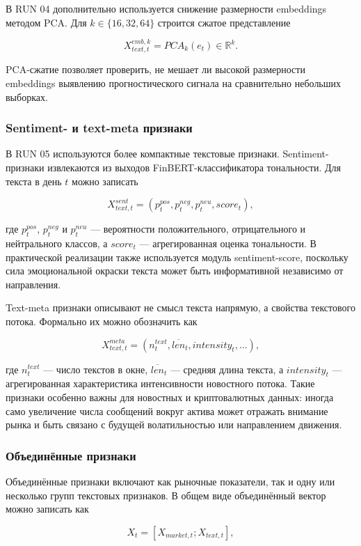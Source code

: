 В RUN 04 дополнительно используется снижение размерности embeddings методом PCA. Для $k \in \{16,32,64\}$ строится сжатое представление

\[
X_{text,t}^{emb,k} = PCA_k(e_t) \in \mathbb{R}^{k}.
\]

PCA-сжатие позволяет проверить, не мешает ли высокой размерности embeddings выявлению прогностического сигнала на сравнительно небольших выборках.

\subsubsection{Sentiment- и text-meta признаки}

В RUN 05 используются более компактные текстовые признаки. Sentiment-признаки извлекаются из выходов FinBERT-классификатора тональности. Для текста в день $t$ можно записать

\[
X_{text,t}^{sent} = \left(p_t^{pos}, p_t^{neg}, p_t^{neu}, score_t\right),
\]

где $p_t^{pos}$, $p_t^{neg}$ и $p_t^{neu}$ --- вероятности положительного, отрицательного и нейтрального классов, а $score_t$ --- агрегированная оценка тональности. В практической реализации также используется модуль sentiment-score, поскольку сила эмоциональной окраски текста может быть информативной независимо от направления.

Text-meta признаки описывают не смысл текста напрямую, а свойства текстового потока. Формально их можно обозначить как

\[
X_{text,t}^{meta} = \left(n_t^{text}, \overline{len}_t, intensity_t, \ldots\right),
\]

где $n_t^{text}$ --- число текстов в окне, $\overline{len}_t$ --- средняя длина текста, а $intensity_t$ --- агрегированная характеристика интенсивности новостного потока. Такие признаки особенно важны для новостных и криптовалютных данных: иногда само увеличение числа сообщений вокруг актива может отражать внимание рынка и быть связано с будущей волатильностью или направлением движения.

\subsubsection{Объединённые признаки}

Объединённые признаки включают как рыночные показатели, так и одну или несколько групп текстовых признаков. В общем виде объединённый вектор можно записать как

\[
X_t = [X_{market,t}; X_{text,t}],
\]

